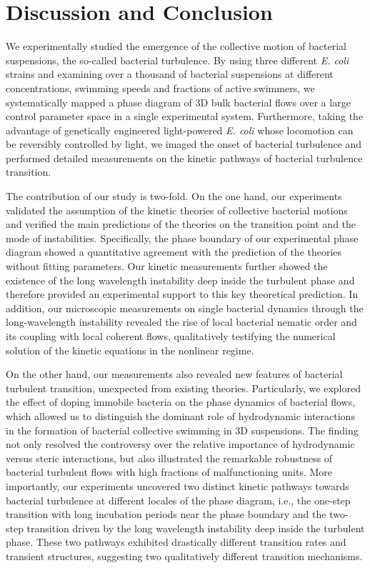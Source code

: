 \section{Discussion and Conclusion}

We experimentally studied the emergence of the collective motion of bacterial suspensions, the so-called bacterial turbulence. By using three different \textit{E. coli} strains and examining over a thousand of bacterial suspensions at different concentrations, swimming speeds and fractions of active swimmers, we
systematically mapped a phase diagram of 3D bulk bacterial flows over a large control parameter space in a single experimental system. Furthermore, taking the advantage of genetically engineered light-powered \textit{E. coli} whose locomotion can be reversibly controlled by light, we imaged the onset of bacterial turbulence and performed detailed measurements on the kinetic pathways of bacterial turbulence transition.

The contribution of our study is two-fold. On the one hand, our experiments validated the assumption of the kinetic theories of collective bacterial motions and verified the main predictions of the theories on the transition point and the mode of instabilities. Specifically, the phase boundary of our experimental phase diagram showed a quantitative agreement with the prediction of the theories without fitting parameters. Our kinetic measurements further showed the existence of the long wavelength instability deep inside the turbulent phase and therefore provided an experimental support to this key theoretical prediction. In
addition, our microscopic measurements on single bacterial dynamics through the long-wavelength instability revealed the rise of local bacterial nematic order and its coupling with local coherent flows, qualitatively testifying the numerical solution of the kinetic equations in the nonlinear regime.


On the other hand, our measurements also revealed new features of bacterial turbulent transition, unexpected from existing theories. Particularly, we explored the effect of doping immobile bacteria on the phase dynamics of bacterial flows, which allowed us to distinguish the dominant role of hydrodynamic interactions in the formation of bacterial collective swimming in 3D suspensions. The finding not only resolved the controversy over the relative importance of hydrodynamic versus steric interactions, but also illustrated the remarkable robustness of bacterial turbulent flows with high fractions of malfunctioning units. More importantly, our experiments uncovered two distinct kinetic pathways towards bacterial turbulence at different locales of the phase diagram, i.e., the one-step transition with long incubation periods near the phase boundary and the two-step transition driven by the long wavelength instability deep inside the
turbulent phase. These two pathways exhibited drastically different transition rates and transient structures, suggesting two qualitatively different transition mechanisms.

